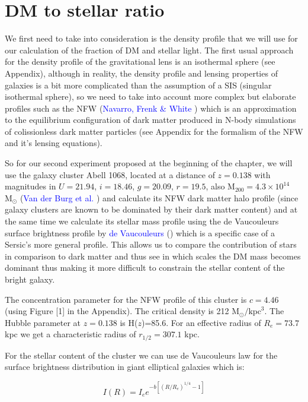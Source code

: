\section{DM to stellar ratio}

We first need to take into consideration is the density profile that we will use for our calculation of the fraction of DM and stellar light. The first usual approach for the density profile of the gravitational lens is an isothermal sphere (see Appendix), although in reality, the density profile and lensing properties of galaxies is a bit more complicated than the assumption of a SIS (singular isothermal sphere), so we need to take into account more complex but elaborate profiles such as the NFW (\textcolor{blue}{Navarro, Frenk \& White} \citeyear{Reference17}) which is an approximation to the equilibrium configuration of dark matter produced in N-body simulations of colissionless dark matter particles (see Appendix for the formalism of the NFW and it's lensing equations).

So for our second experiment proposed at the beginning of the chapter, we will use the galaxy cluster Abell 1068, located at a distance of $z=0.138$ with magnitudes in $U=21.94$, $i=18.46$, $g=20.09$, $r=19.5$, also $\text{M}_{200}=4.3\times 10^{14}$ $\text{M}_{\odot}$ (\textcolor{blue}{Van der Burg et al.} \citeyear{Reference2}) and calculate its NFW dark matter halo profile (since galaxy clusters are known to be dominated by their dark matter content) and at the same time we calculate its stellar mass profile using the de Vaucouleurs surface brightness profile by \textcolor{blue}{de Vaucouleurs} (\citeyear{Reference32}) which is a specific case of a Sersic's more general profile. This allows us to compare the contribution of stars in comparison to dark matter and thus see in which scales the DM mass becomes dominant thus making it more difficult to constrain the stellar content of the bright galaxy.

The concentration parameter for the NFW profile of this cluster is $c=4.46$ (using Figure [1] in the Appendix). The critical density is 212 $\text{M}_{\odot}/\text{kpc}^{3}$. The Hubble parameter at $z=0.138$ is H($z$)=85.6. For an effective radius of $R_{e}=73.7$ kpc we get a characteristic radius of $r_{1/2}=307.1$ kpc.

For the stellar content of the cluster we can use de Vaucouleurs law for the surface brightness distribution in giant elliptical galaxies which is:

\begin{equation}
I(R)=I_{e}e^{-b\left[\left(R/R_{e}\right)^{1/4}-1\right]}
\end{equation}

